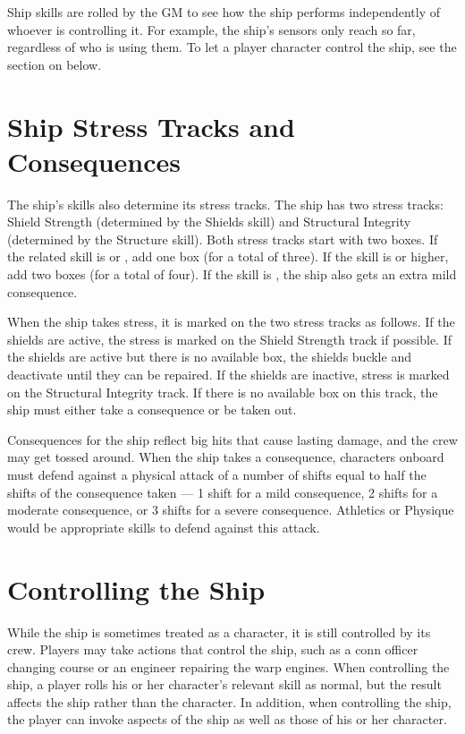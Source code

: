 \documentclass[12pt,titlepage,openany]{book}
\begin{document}
Ship skills are rolled by the GM to see how the ship performs independently of
whoever is controlling it. For example, the ship's sensors only reach so far,
regardless of who is using them. To let a player character control the ship, see
the section on  below.

\section{Ship Stress Tracks and Consequences}\label{sec:ship-stress}

The ship's skills also determine its stress tracks. The ship has two stress
tracks: Shield Strength (determined by the Shields skill) and Structural
Integrity (determined by the Structure skill). Both stress tracks start with
two boxes. If the related skill is  or , add one box
(for a total of three). If the skill is  or higher, add two boxes
(for a total of four). If the skill is , the ship also gets an
extra mild consequence.

When the ship takes stress, it is marked on the two stress tracks as follows.
If the shields are active, the stress is marked on the Shield Strength track if
possible. If the shields are active but there is no available box, the shields
buckle and deactivate until they can be repaired. If the shields are inactive,
stress is marked on the Structural Integrity track. If there is no available
box on this track, the ship must either take a consequence or be taken out.

Consequences for the ship reflect big hits that cause lasting damage, and the
crew may get tossed around. When the ship takes a consequence, characters
onboard must defend against a physical attack of a number of shifts equal to
half the shifts of the consequence taken --- 1 shift for a mild consequence, 2
shifts for a moderate consequence, or 3 shifts for a severe consequence.
Athletics or Physique would be appropriate skills to defend against this
attack.

\section{Controlling the Ship}\label{sec:control-ship}

While the ship is sometimes treated as a character, it is still controlled by
its crew. Players may take actions that control the ship, such as a conn
officer changing course or an engineer repairing the warp engines. When
controlling the ship, a player rolls his or her character's relevant skill as
normal, but the result affects the ship rather than the character. In addition,
when controlling the ship, the player can invoke aspects of the ship as well as
those of his or her character.
\end{document}
